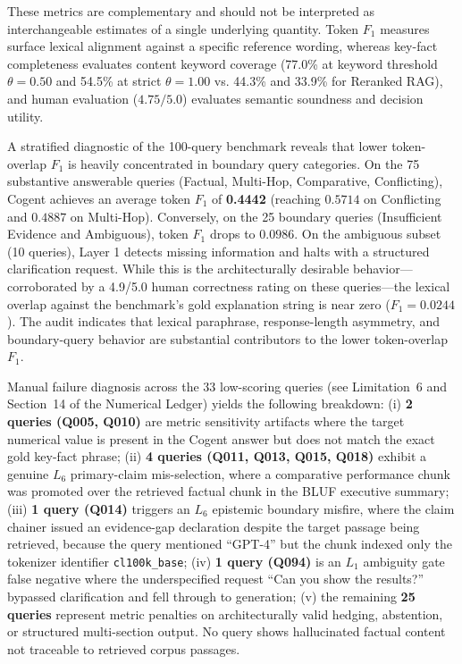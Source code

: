 \documentclass[journal,compsoc]{IEEEtran}
\begin{document}
These metrics are complementary and should not be interpreted as interchangeable estimates of a single underlying quantity. Token $F_1$ measures surface lexical alignment against a specific reference wording, whereas key-fact completeness evaluates content keyword coverage (77.0\% at keyword threshold $\theta=0.50$ and 54.5\% at strict $\theta=1.00$ vs. 44.3\% and 33.9\% for Reranked RAG), and human evaluation ($4.75/5.0$) evaluates semantic soundness and decision utility.

A stratified diagnostic of the 100-query benchmark reveals that lower token-overlap $F_1$ is heavily concentrated in boundary query categories. On the 75 substantive answerable queries (Factual, Multi-Hop, Comparative, Conflicting), Cogent achieves an average token $F_1$ of \textbf{0.4442} (reaching $0.5714$ on Conflicting and $0.4887$ on Multi-Hop). Conversely, on the 25 boundary queries (Insufficient Evidence and Ambiguous), token $F_1$ drops to $0.0986$. On the ambiguous subset (10 queries), Layer 1 detects missing information and halts with a structured clarification request. While this is the architecturally desirable behavior---corroborated by a 4.9/5.0 human correctness rating on these queries---the lexical overlap against the benchmark's gold explanation string is near zero ($F_1 = 0.0244$). The audit indicates that lexical paraphrase, response-length asymmetry, and boundary-query behavior are substantial contributors to the lower token-overlap $F_1$.

Manual failure diagnosis across the 33 low-scoring queries (see Limitation~6 and Section~14 of the Numerical Ledger) yields the following breakdown: (i) \textbf{2 queries (Q005, Q010)} are metric sensitivity artifacts where the target numerical value is present in the Cogent answer but does not match the exact gold key-fact phrase; (ii) \textbf{4 queries (Q011, Q013, Q015, Q018)} exhibit a genuine $L_6$ primary-claim mis-selection, where a comparative performance chunk was promoted over the retrieved factual chunk in the BLUF executive summary; (iii) \textbf{1 query (Q014)} triggers an $L_6$ epistemic boundary misfire, where the claim chainer issued an evidence-gap declaration despite the target passage being retrieved, because the query mentioned ``GPT-4'' but the chunk indexed only the tokenizer identifier \texttt{cl100k\_base}; (iv) \textbf{1 query (Q094)} is an $L_1$ ambiguity gate false negative where the underspecified request ``Can you show the results?'' bypassed clarification and fell through to generation; (v) the remaining \textbf{25 queries} represent metric penalties on architecturally valid hedging, abstention, or structured multi-section output. No query shows hallucinated factual content not traceable to retrieved corpus passages.
\end{document}
